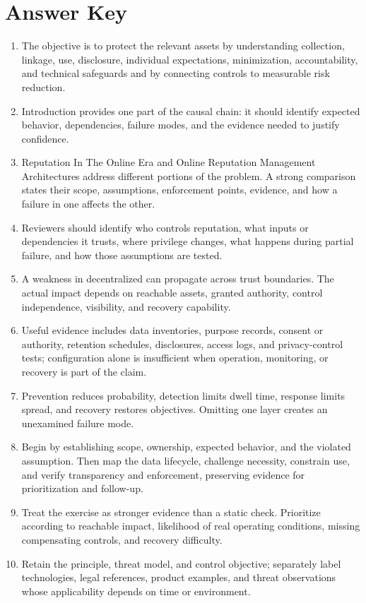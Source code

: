 \documentclass[11pt,letterpaper]{article}
\begin{document}
\section*{Answer Key}
\begin{enumerate}
\item The objective is to protect the relevant assets by understanding collection, linkage, use, disclosure, individual expectations, minimization, accountability, and technical safeguards and by connecting controls to measurable risk reduction.
\item Introduction provides one part of the causal chain: it should identify expected behavior, dependencies, failure modes, and the evidence needed to justify confidence.
\item Reputation In The Online Era and Online Reputation Management Architectures address different portions of the problem. A strong comparison states their scope, assumptions, enforcement points, evidence, and how a failure in one affects the other.
\item Reviewers should identify who controls reputation, what inputs or dependencies it trusts, where privilege changes, what happens during partial failure, and how those assumptions are tested.
\item A weakness in decentralized can propagate across trust boundaries. The actual impact depends on reachable assets, granted authority, control independence, visibility, and recovery capability.
\item Useful evidence includes data inventories, purpose records, consent or authority, retention schedules, disclosures, access logs, and privacy-control tests; configuration alone is insufficient when operation, monitoring, or recovery is part of the claim.
\item Prevention reduces probability, detection limits dwell time, response limits spread, and recovery restores objectives. Omitting one layer creates an unexamined failure mode.
\item Begin by establishing scope, ownership, expected behavior, and the violated assumption. Then map the data lifecycle, challenge necessity, constrain use, and verify transparency and enforcement, preserving evidence for prioritization and follow-up.
\item Treat the exercise as stronger evidence than a static check. Prioritize according to reachable impact, likelihood of real operating conditions, missing compensating controls, and recovery difficulty.
\item Retain the principle, threat model, and control objective; separately label technologies, legal references, product examples, and threat observations whose applicability depends on time or environment.
\end{enumerate}
\end{document}
